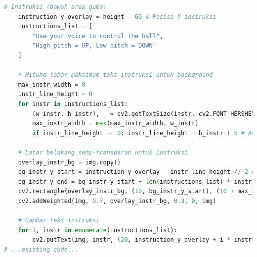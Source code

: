 \documentclass[11pt,a4paper]{article}
\begin{document}
\begin{itemize}
\begin{itemize}
\begin{lstlisting}[language=Python, caption=Fungsi draw\_game\_view\_overlay]
    # Instruksi (bawah area game)
    instruction_y_overlay = height - 60 # Posisi Y instruksi
    instructions_list = [
        "Use your voice to control the ball",
        "High pitch = UP, Low pitch = DOWN"
    ]
    
    # Hitung lebar maksimum teks instruksi untuk background
    max_instr_width = 0
    instr_line_height = 0
    for instr in instructions_list:
        (w_instr, h_instr), _ = cv2.getTextSize(instr, cv2.FONT_HERSHEY_SIMPLEX, 0.5, 1)
        max_instr_width = max(max_instr_width, w_instr)
        if instr_line_height == 0: instr_line_height = h_instr + 5 # Ambil tinggi satu baris + padding

    # Latar belakang semi-transparan untuk instruksi
    overlay_instr_bg = img.copy()
    bg_instr_y_start = instruction_y_overlay - instr_line_height // 2 # Sesuaikan agar teks di tengah background
    bg_instr_y_end = bg_instr_y_start + len(instructions_list) * instr_line_height + 10
    cv2.rectangle(overlay_instr_bg, (10, bg_instr_y_start), (10 + max_instr_width + 20, bg_instr_y_end), (0, 0, 0), -1)
    cv2.addWeighted(img, 0.7, overlay_instr_bg, 0.3, 0, img)
    
    # Gambar teks instruksi
    for i, instr in enumerate(instructions_list):
        cv2.putText(img, instr, (20, instruction_y_overlay + i * instr_line_height), cv2.FONT_HERSHEY_SIMPLEX, 0.5, config.color_schemes["text_secondary"], 1)
# ...existing code...
\end{lstlisting}
\end{itemize}
\end{itemize}
\end{document}
